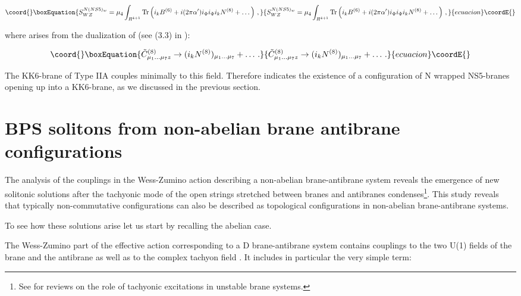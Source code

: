 \documentclass[12pt,a4paper]{article}
\begin{document}
\begin{equation}\coord{}\boxEquation{
S^{N (NS5)_w}_{WZ}=\mu_4\int_{R^{4+1}}{\rm Tr}\left(i_k B^{(6)}+
i(2\pi\alpha^\prime)i_\Phi i_\Phi i_k N^{(8)}+\dots\right)\, ,
}{
S^{N (NS5)_w}_{WZ}=\mu_4\int_{R^{4+1}}{\rm Tr}\left(i_k B^{(6)}+
i(2\pi\alpha^\prime)i_\Phi i_\Phi i_k N^{(8)}+\dots\right)\, ,
}{ecuacion}\coordE{}\end{equation}

\noindent where \coordHE{} arises from the dualization of 
\coordHE{} (see (3.3) in \cite{EL}):

\begin{equation}\coord{}\boxEquation{
{\tilde C}^{(8)}_{\mu_1\dots\mu_7 z}\rightarrow 
(i_k N^{(8)})_{\mu_1\dots\mu_7}+\dots\, .
}{
{\tilde C}^{(8)}_{\mu_1\dots\mu_7 z}\rightarrow 
(i_k N^{(8)})_{\mu_1\dots\mu_7}+\dots\, .
}{ecuacion}\coordE{}\end{equation}

\noindent The KK6-brane of Type IIA couples
minimally to this field.
Therefore \coordHE{} indicates the existence
of a configuration of
N wrapped NS5-branes opening up into a KK6-brane, as we discussed in
the previous section.



\section{BPS solitons from non-abelian brane antibrane configurations}

The analysis of the couplings in the Wess-Zumino action 
describing a non-abelian 
brane-antibrane system reveals the emergence of new solitonic solutions
after the tachyonic mode of the open strings stretched between branes and
antibranes condenses\footnote{See \cite{reviews} for reviews on the role
of tachyonic excitations in unstable brane systems.}.  
This study reveals that typically non-commutative configurations can
also be described as topological configurations in non-abelian
brane-antibrane systems.

To see how these solutions arise let us start by recalling the abelian case. 

The Wess-Zumino part of the
effective action corresponding to a D\coordHE{} brane-antibrane system 
contains couplings to the two U(1) fields of the brane and the 
antibrane as
well as to the complex tachyon field \cite{KW}. It includes in 
particular the very simple term:
\end{document}
